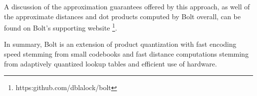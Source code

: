 A discussion of the approximation guarantees offered by this approach, as well of the approximate distances and dot products computed by Bolt overall, can be found on Bolt's supporting website \footnote{https:github.com/dblalock/bolt}.











In summary, Bolt is an extension of product quantization with fast encoding speed stemming from small codebooks and fast distance computations stemming from adaptively quantized lookup tables and efficient use of hardware.








